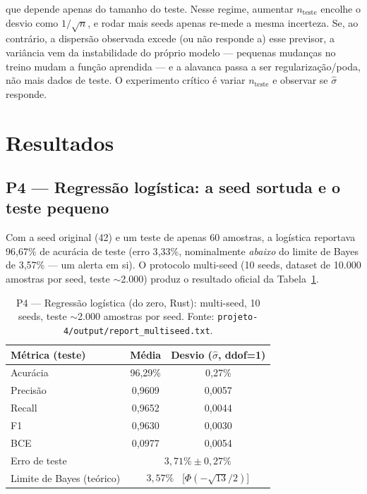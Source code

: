\documentclass[12pt]{article}
\begin{document}
que depende apenas do tamanho do teste. Nesse regime, aumentar
$n_{\text{teste}}$ encolhe o desvio como $1/\sqrt{n}$, e rodar mais seeds
apenas re-mede a mesma incerteza. Se, ao contrário, a dispersão observada
excede (ou não responde a) esse previsor, a variância vem da instabilidade
do próprio modelo --- pequenas mudanças no treino mudam a função aprendida
--- e a alavanca passa a ser regularização/poda, não mais dados de teste. O
experimento crítico é variar $n_{\text{teste}}$ e observar se
$\hat{\sigma}$ responde.

\section{Resultados}\label{sec:res}

\subsection{P4 --- Regressão logística: a seed sortuda e o teste pequeno}
\label{sec:res-p4}

Com a seed original (42) e um teste de apenas 60 amostras, a logística
reportava 96{,}67\% de acurácia de teste (erro 3{,}33\%, nominalmente
\emph{abaixo} do limite de Bayes de 3{,}57\% --- um alerta em si). O
protocolo multi-seed (10 seeds, dataset de 10.000 amostras por seed, teste
$\sim$2.000) produz o resultado oficial da Tabela~\ref{tab:p4}.

\begin{table}[htb]
\centering
\caption{P4 --- Regressão logística (do zero, Rust): multi-seed, 10 seeds,
teste $\sim$2.000 amostras por seed. Fonte:
\texttt{projeto-4/output/report\_multiseed.txt}.}
\label{tab:p4}
\begin{tabular}{lcc}
\toprule
Métrica (teste) & Média & Desvio ($\hat{\sigma}$, ddof=1) \\
\midrule
Acurácia   & 96{,}29\% & 0{,}27\% \\
Precisão   & 0{,}9609  & 0{,}0057 \\
Recall     & 0{,}9652  & 0{,}0044 \\
F1         & 0{,}9630  & 0{,}0030 \\
BCE        & 0{,}0977  & 0{,}0054 \\
\midrule
Erro de teste & \multicolumn{2}{c}{$3{,}71\% \pm 0{,}27\%$} \\
Limite de Bayes (teórico) & \multicolumn{2}{c}{$3{,}57\%$
  \ [$\Phi(-\sqrt{13}/2)$]} \\
\bottomrule
\end{tabular}
\end{table}
\end{document}
